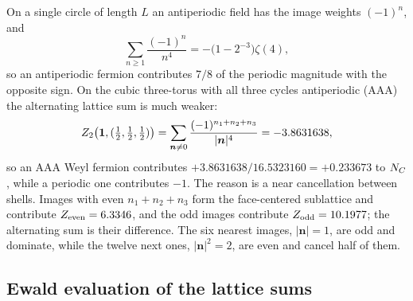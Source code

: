 On a single circle of length $L$ an antiperiodic field has the image weights $(-1)^n$, and
\begin{equation}
\sum_{n\geq1}\frac{(-1)^n}{n^4}=-\big(1-2^{-3}\big)\zeta(4),
\end{equation}
so an antiperiodic fermion contributes $7/8$ of the periodic magnitude with the opposite sign. %
On the cubic three-torus with all three cycles antiperiodic (AAA) the alternating lattice sum is much weaker:
\begin{equation}
Z_2\big(\rAone,(\tfrac12,\tfrac12,\tfrac12)\big)=\sum_{\bm n\neq0}\frac{(-1)^{n_1+n_2+n_3}}{|\bm n|^4}=-3.8631638, %
\label{eq:rA-aaa-sum}
\end{equation}
so an AAA Weyl fermion contributes $+3.8631638/16.5323160=+0.233673$ to $N_C$, while a periodic one contributes $-1$. %
The reason is a near cancellation between shells.
Images with even $n_1+n_2+n_3$ form the face-centered sublattice and contribute $Z_{\rm even}=6.3346$, and the odd images contribute $Z_{\rm odd}=10.1977$; the alternating sum is their difference. %
The six nearest images, $|\bm n|=1$, are odd and dominate, while the twelve next ones, $|\bm n|^2=2$, are even and cancel half of them.

\subsection{Ewald evaluation of the lattice sums}
\label{rA:ewald}

